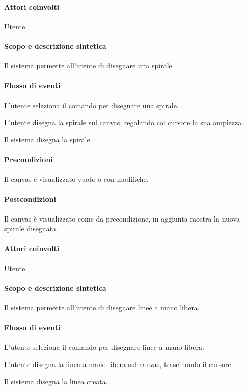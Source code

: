 \paragraph{Attori coinvolti} Utente.
\paragraph{Scopo e descrizione sintetica} 
Il sistema permette all'utente di disegnare una spirale.
\paragraph{Flusso di eventi}
\begin{elenconumerato}[\textbf{}]{\subsubsecindent}
\item L'utente seleziona il comando per disegnare una spirale.
\item L'utente disegna la spirale sul canvas, regolando col cursore la sua ampiezza.
\item Il sistema disegna la spirale.
\end{elenconumerato}
\paragraph{Precondizioni} Il canvas \`e visualizzato vuoto o con modifiche.
\paragraph{Postcondizioni} Il canvas \`e visualizzato come da precondizione, in aggiunta mostra la nuova spirale disegnata.

\paragraph{Attori coinvolti} Utente.
\paragraph{Scopo e descrizione sintetica} 
Il sistema permette all'utente di disegnare linee a mano libera.
\paragraph{Flusso di eventi}
\begin{elenconumerato}[\textbf{}]{\subsubsecindent}
\item L'utente seleziona il comando per disegnare linee a mano libera.
\item L'utente disegna la linea a mano libera sul canvas, trascinando il cursore.
\item Il sistema disegna la linea creata.
\end{elenconumerato}
